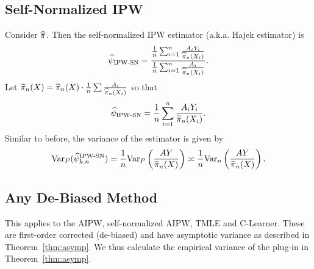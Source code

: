 \subsection{Self-Normalized IPW}\label{sec:ci_nAIPW}
Consider $\widehat{\pi}$. Then the self-normalized IPW estimator (a.k.a. Hajek estimator) is
$$\widehat{\psi}_{\text{IPW-SN}}=\frac{ \frac{1}{n}\sum_{i=1}^n \frac{A_iY_i}{\widehat{\pi}_n(X_i)} }{ \frac{1}{n}\sum_{i=1}^n \frac{A_i}{\widehat{\pi}_n(X_i)} }.$$
Let $\widetilde{\pi}_n(X) = \widehat{\pi}_n(X) \cdot \frac{1}{n}\sum \frac{A_i}{\widehat{\pi}_n(X_i)}$
so that 
$$\widehat{\psi}_{\text{IPW-SN}}= \frac{1}{n}\sum_{i=1}^n \frac{A_iY_i}{\widetilde{\pi}_n(X_i)}.$$
Similar to before, the variance of the estimator is given by
\begin{align*}
    {\rm Var}_P(\widehat{\psi}_{k,n}^{\text{IPW-SN}}) = \frac{1}{n}{\rm Var}_P\left(\frac{AY}{\widetilde{\pi}_{n}(X)} \right) 
    \asymp \frac{1}{n}{\rm Var}_{n}\left(\frac{AY}{\widetilde{\pi}_{n}(X)} \right).
\end{align*}

\subsection{Any De-Biased Method}
This applies to the AIPW, self-normalized AIPW, TMLE and C-Learner. 
These are first-order corrected (de-biased) and have asymptotic variance as described in Theorem~\ref{thm:asymp}. We thus calculate the empirical variance of the plug-in in Theorem~\ref{thm:asymp}. 




